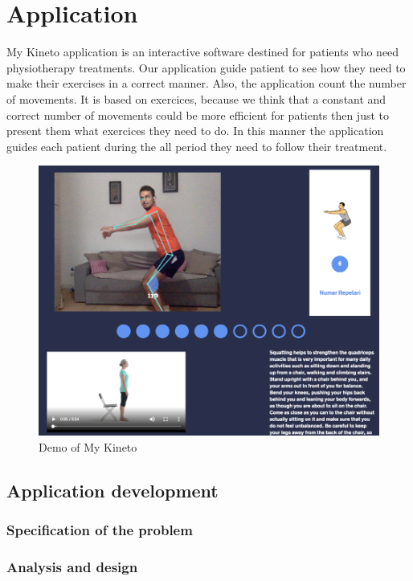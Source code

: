 
\chapter{Application}

\par My Kineto application is an interactive software destined for patients who need physiotherapy treatments. Our application guide patient to see how they need to make their exercises in a correct manner. Also, the application count the number of movements. It is based on exercices, because we think that a constant and correct number of movements could be more efficient for patients then just to present them what exercices they need to do. In this manner the application guides each patient during the all period they need to follow their treatment. 
\begin{figure}[htbp]
	\centerline{\includegraphics[scale=0.8]{fig/demo-mykineto.png}}  
	\caption{Demo of My Kineto}
\end{figure}

\section{Application development}
\subsection{Specification of the problem}
\subsection{Analysis and design}
